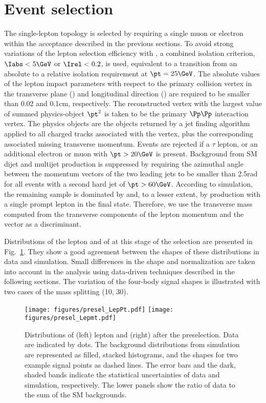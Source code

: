 \section{Event selection}\label{sec:singlelepton}

The single-lepton topology is selected by requiring a single muon or electron within the acceptance described in the previous sections.
To avoid strong variations of the lepton selection efficiency with \pt, a combined isolation criterion, $\Iabs < 5\GeV$ or $\Irel < 0.2$, is used, 
equivalent to a transition from an absolute to a relative isolation requirement at $\pt = 25\GeV$. 
The absolute values of the lepton impact parameters with respect to the primary collision vertex in the transverse plane (\dxy) 
and longitudinal direction (\dz) are required to be smaller than 0.02 and 0.1\unit{cm}, respectively.
The reconstructed vertex with the largest value of summed physics-object $\pt^2$ is taken to be the primary $\Pp\Pp$ interaction vertex. 
The physics objects are the objects returned by a jet finding algorithm~\cite{Cacciari:2008gp,Cacciari:2011ma} applied to all charged 
tracks associated with the vertex, plus the corresponding associated missing transverse momentum.
Events are rejected if a $\tau$ lepton, or an additional electron or muon with $\pt > 20\GeV$ is present.
Background from SM dijet and multijet production is suppressed by requiring the azimuthal angle between the momentum vectors of the two leading jets to be smaller than 2.5\unit{rad} for all events with a second hard jet of $\pt>60\GeV$.
According to simulation, the remaining sample is dominated by \Wjets and, to a lesser extent, by \ttbar production with a single prompt lepton in the final state.
Therefore, we use the transverse mass \mt computed from the transverse components of the lepton momentum and the \ptmiss vector as a discriminant.

Distributions of the lepton \pt and of \mt at this stage of the selection are presented in Fig.~\ref{fig:slPresel}.
They show a  good agreement between the shapes of these distributions in data and simulation.  
Small differences in the shape and normalization are taken into account in the analysis using data-driven techniques described in the following sections.
The variation of the four-body signal shapes is illustrated with two cases of the mass splitting (10, 30\GeV).

\begin{figure}
  \centering
  \texttt{[image: figures/presel\_LepPt.pdf]} \hfil
  \texttt{[image: figures/presel\_Lepmt.pdf]}
\caption{Distributions of (left) lepton \pt and (right) \mt after the preselection.
  Data are indicated by dots.
  The background distributions from simulation are represented as filled, stacked histograms,
 and the shapes for two example signal points as dashed lines.
  The error bars and the dark, shaded bands indicate the statistical uncertainties of data and simulation, respectively. 
  The lower panels show the ratio of data to the sum of the SM backgrounds.
  }\label{fig:slPresel}
\end{figure}


